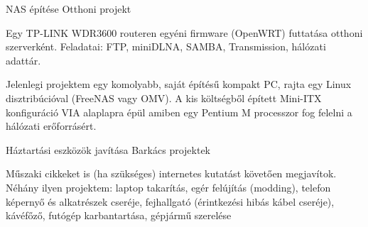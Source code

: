 \begin{cventries}
  \cventry
    {NAS építése} %
    {Otthoni projekt} %
    {} %
    {} %
    {
      \begin{cvitems} %
        \item {Egy TP-LINK WDR3600 routeren egyéni firmware (OpenWRT) futtatása otthoni szerverként. Feladatai: FTP, miniDLNA, SAMBA, Transmission,
        	hálózati adattár.}
        \item {Jelenlegi projektem egy komolyabb, saját építésű kompakt PC, rajta egy Linux disztribúcióval (FreeNAS vagy OMV). A kis költségből épített
        	Mini-ITX konfiguráció VIA alaplapra épül amiben egy Pentium M processzor fog felelni a hálózati erőforrásért.}
      \end{cvitems}
    }

  \cventry
    {Háztartási eszközök javítása} %
    {Barkács projektek} %
    {} %
    {} %
    {
      \begin{cvitems} %
        \item {Műszaki cikkeket is (ha szükséges) internetes kutatást követően megjavítok. \\
        	Néhány ilyen projektem: laptop takarítás, egér felújítás (modding), telefon képernyő és alkatrészek cseréje, fejhallgató (érintkezési hibás kábel cseréje), kávéfőző, futógép karbantartása, gépjármű szerelése}
      \end{cvitems}
    }

\end{cventries}
